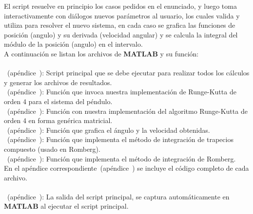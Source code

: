 
El script resuelve en principio los casos pedidos en el enunciado, y luego toma interactivamente con diálogos nuevos parámetros al usuario, los cuales valida y utiliza para resolver el nuevo sistema, en cada caso se grafica las funciones de posición (angulo) y su derivada (velocidad angular) y se calcula la integral del módulo de la posición (angulo) en el intervalo.\\


A continuación se listan los archivos de \textbf{MATLAB} y su función: \\\\


\textbf{}~(apéndice~): Script principal que se debe ejecutar para realizar todos los cálculos y generar los archivos de resultados.\\

\textbf{}~(apéndice~): Función que invoca nuestra implementación de Runge-Kutta de orden 4 para el sistema del péndulo.\\

\textbf{}~(apéndice~): Función con nuestra implementación del algoritmo Runge-Kutta de orden 4 en forma genérica matricial.\\

\textbf{}~(apéndice~): Función que grafica el ángulo y la velocidad obtenidas.\\

\textbf{}~(apéndice~): Función que implementa el método de integración de trapecios compuesto (usado en Romberg).\\

\textbf{}~(apéndice~): Función que implementa el método de integración de Romberg.\\

En el apéndice correspondiente~(apéndice~) se incluye el código completo de cada archivo.\\\\

\textbf{}~(apéndice~): La salida del script principal, se captura automáticamente en \textbf{MATLAB} al ejecutar el script principal.\\\\



